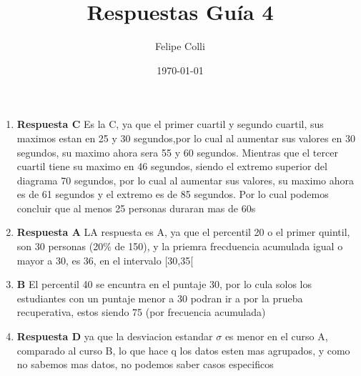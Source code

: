 \documentclass[11pt]{article}
\title{Respuestas Guía 4}
\author{Felipe Colli}
\date{\today}
\begin{document}
\maketitle

\begin{enumerate}
\section{Respuestas 01-20}

    


\section{Respuestas 21-40}


\section{Respuestas 41-60}


\section{Respuestas 61-80}


\section{Respuestas 81-100}

    \item \textbf{Respuesta C} Es la C, ya que el primer cuartil y segundo cuartil, sus maximos estan en 25 y 30 segundos,por lo cual al aumentar sus valores en 30 segundos, su maximo ahora sera 55 y 60 segundos. Mientras que el tercer cuartil tiene su maximo en 46 segundos, siendo el extremo superior del diagrama 70 segundos, por lo cual al aumentar sus valores, su maximo ahora es de 61 segundos y el extremo es de 85 segundos. Por lo cual podemos concluir que al menos 25 personas duraran mas de 60s %
    \item \textbf{Respuesta A} LA respuesta es A, ya que el percentil 20 o el primer quintil, son 30 personas (20\% de 150), y la priemra frecduencia acumulada igual o mayor a 30, es 36, en el intervalo [30,35[ %
    \item \textbf{B} El percentil 40 se encuntra en el puntaje 30, por lo cula solos los estudiantes con un puntaje menor a 30 podran ir a por la prueba recuperativa, estos siendo 75 (por frecuencia acumulada) %

    \item \textbf{Respuesta D} ya que la desviacion estandar $\sigma$ es menor en el curso A, comparado al curso B, lo que hace q los datos esten mas agrupados, y como no sabemos mas datos, no podemos saber casos especificos  %


\end{enumerate}
\end{document}
